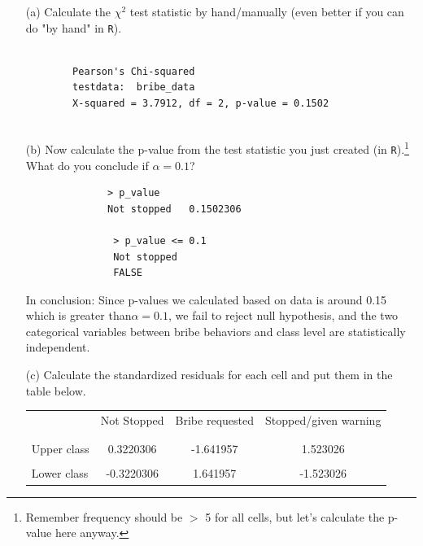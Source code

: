 \documentclass[12pt,letterpaper]{article}
\begin{document}
\begin{enumerate}
	
	\item [(a)]
	Calculate the $\chi^2$ test statistic by hand/manually (even better if you can do "by hand" in \texttt{R}).\\
	\vspace{1cm}
	  
	\begin{verbatim}
	
		Pearson's Chi-squared 
		testdata:  bribe_data
		X-squared = 3.7912, df = 2, p-value = 0.1502
		
	\end{verbatim}
	\item [(b)]
	Now calculate the p-value from the test statistic you just created (in \texttt{R}).\footnote{Remember frequency should be $>$ 5 for all cells, but let's calculate the p-value here anyway.}  What do you conclude if $\alpha = 0.1$?\\
	
		  
		
			\begin{verbatim}
		      > p_value
		      Not stopped   0.1502306
		      
		       > p_value <= 0.1
		       Not stopped       
		       FALSE 
		\end{verbatim}
		
	In conclusion: 
    Since p-values we calculated based on data is around 0.15 which is greater than$\alpha = 0.1$, we fail to reject null hypothesis, and the two categorical variables between bribe behaviors and class level are statistically independent. 
	\newpage
	\item [(c)] Calculate the standardized residuals for each cell and put them in the table below.
	\vspace{1cm}
	
	\begin{table}[h]
		\centering
		\begin{tabular}{l | c c c }
			& Not Stopped & Bribe requested & Stopped/given warning \\
			\\[-1.8ex] 
			\hline \\[-1.8ex]
			Upper class &0.3220306& -1.641957 & 1.523026   \\  
			\\
			Lower class  &-0.3220306&  1.641957&  -1.523026   \\   
			

\end{tabular}
\end{table}
\end{enumerate}
\end{document}
